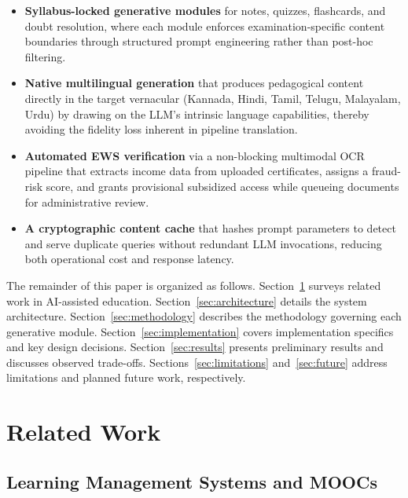 \documentclass[conference]{IEEEtran}
\begin{document}
\begin{itemize}[leftmargin=*]
    \item \textbf{Syllabus-locked generative modules} for notes, quizzes, flashcards, and doubt resolution, where each module enforces examination-specific content boundaries through structured prompt engineering rather than post-hoc filtering.

    \item \textbf{Native multilingual generation} that produces pedagogical content directly in the target vernacular (Kannada, Hindi, Tamil, Telugu, Malayalam, Urdu) by drawing on the LLM's intrinsic language capabilities, thereby avoiding the fidelity loss inherent in pipeline translation.

    \item \textbf{Automated EWS verification} via a non-blocking multimodal OCR pipeline that extracts income data from uploaded certificates, assigns a fraud-risk score, and grants provisional subsidized access while queueing documents for administrative review.

    \item \textbf{A cryptographic content cache} that hashes prompt parameters to detect and serve duplicate queries without redundant LLM invocations, reducing both operational cost and response latency.
\end{itemize}

The remainder of this paper is organized as follows. Section~\ref{sec:related} surveys related work in AI-assisted education. Section~\ref{sec:architecture} details the system architecture. Section~\ref{sec:methodology} describes the methodology governing each generative module. Section~\ref{sec:implementation} covers implementation specifics and key design decisions. Section~\ref{sec:results} presents preliminary results and discusses observed trade-offs. Sections~\ref{sec:limitations} and~\ref{sec:future} address limitations and planned future work, respectively.

\section{Related Work}
\label{sec:related}

\subsection{Learning Management Systems and MOOCs}
\end{document}
